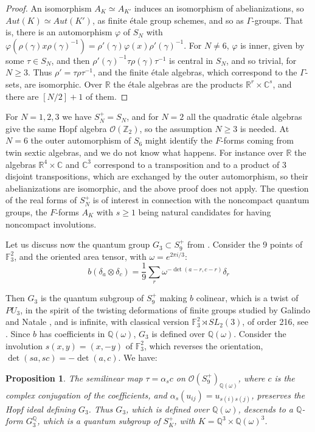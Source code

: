 \documentclass[11pt]{amsart}
\newtheorem{proposition}[theorem]{Proposition}
\theoremstyle{definition}
\begin{document}
\begin{proof}
An isomorphism $A_K\simeq A_{K'}$ induces an isomorphism of abelianizations, so $Aut(K)\simeq Aut(K')$, as finite étale group schemes, and so as $\Gamma$-groups. That is, there is an automorphism $\varphi$ of $S_N$ with $\varphi(\rho(\gamma)x\rho(\gamma)^{-1})=\rho'(\gamma)\varphi(x)\rho'(\gamma)^{-1}$. For $N\neq6$, $\varphi$ is inner, given by some $\tau\in S_N$, and then $\rho'(\gamma)^{-1}\tau\rho(\gamma)\tau^{-1}$ is central in $S_N$, and so trivial, for $N\geq3$. Thus $\rho'=\tau\rho\tau^{-1}$, and the finite étale algebras, which correspond to the $\Gamma$-sets, are isomorphic. Over $\mathbb R$ the étale algebras are the products $\mathbb R^r\times\mathbb C^s$, and there are $[N/2]+1$ of them.
\end{proof}

For $N=1,2,3$ we have $S_N^+=S_N$, and for $N=2$ all the quadratic étale algebras give the same Hopf algebra $\mathcal O(\mathbb Z_2)$, so the assumption $N\geq3$ is needed. At $N=6$ the outer automorphism of $S_6$ might identify the $F$-forms coming from twin sextic algebras, and we do not know what happens. For instance over $\mathbb R$ the algebras $\mathbb R^4\times\mathbb C$ and $\mathbb C^3$ correspond to a transposition and to a product of 3 disjoint transpositions, which are exchanged by the outer automorphism, so their abelianizations are isomorphic, and the above proof does not apply. The question of the real forms of $S_N^+$ is of interest in connection with the noncompact quantum groups, the $F$-forms $A_K$ with $s\geq1$ being natural candidates for having noncompact involutions.

Let us discuss now the quantum group $G_3\subset S_9^+$ from \cite{bop}. Consider the 9 points of $\mathbb F_3^2$, and the oriented area tensor, with $\omega=e^{2\pi i/3}$:
$$b(\delta_a\otimes\delta_c)=\frac{1}{9}\sum_r\omega^{-\det(a-r,c-r)}\delta_r$$

Then $G_3$ is the quantum subgroup of $S_9^+$ making $b$ colinear, which is a twist of $PU_3$, in the spirit of the twisting deformations of finite groups studied by Galindo and Natale \cite{gna}, and is infinite, with classical version $\mathbb F_3^2\rtimes SL_2(3)$, of order 216, see \cite{bop}. Since $b$ has coefficients in $\mathbb Q(\omega)$, $G_3$ is defined over $\mathbb Q(\omega)$. Consider the involution $s(x,y)=(x,-y)$ of $\mathbb F_3^2$, which reverses the orientation, $\det(sa,sc)=-\det(a,c)$. We have:

\begin{proposition}
\label{p55}
The semilinear map $\tau=\alpha_sc$ on $\mathcal O(S_9^+)_{\mathbb Q(\omega)}$, where $c$ is the complex conjugation of the coefficients, and $\alpha_s(u_{ij})=u_{s(i)s(j)}$, preserves the Hopf ideal defining $G_3$. Thus $G_3$, which is defined over $\mathbb Q(\omega)$, descends to a $\mathbb Q$-form $G_3^{\mathbb Q}$, which is a quantum subgroup of $S_K^+$, with $K=\mathbb Q^3\times\mathbb Q(\omega)^3$.
\end{proposition}
\end{document}
